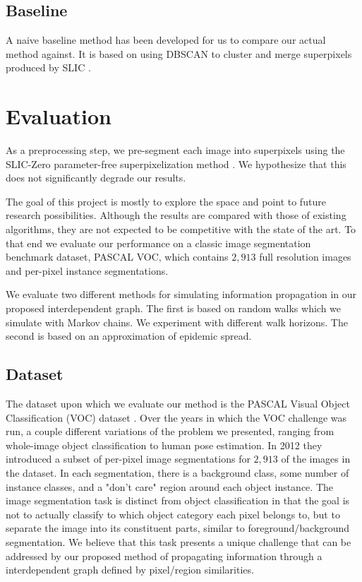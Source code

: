 \documentclass[twocolumn]{article}
\newcommand{\todo}[1]{}
\newcommand{\seclab}[1]{\label{sec:#1}}
\begin{document}
\subsection{Baseline}

A naive baseline method has been developed for us to compare our actual method
against. It is based on using DBSCAN \cite{ester1996density} to cluster and
merge superpixels produced by SLIC \cite{achanta2010slic}.

\section{Evaluation}\seclab{eval}


As a preprocessing step, we pre-segment each image into superpixels using the
SLIC-Zero parameter-free superpixelization method \cite{achanta2010slic}. We
hypothesize that this does not significantly degrade our results. 

The goal of this project is mostly to explore the space and point to future
research possibilities. Although the results are compared with those of
existing algorithms, they are not expected to be competitive with the state of
the art. To that end we evaluate our performance on a classic image segmentation
benchmark dataset, PASCAL VOC, which contains $2,913$ full resolution images and
per-pixel instance segmentations.

We evaluate two different methods for simulating information propagation in our
proposed interdependent graph. The first is based on random walks which we
simulate with Markov chains. We experiment with different walk horizons. The
second is based on an approximation of epidemic spread. \todo{Emory, please
explain this in detail here.}

\subsection{Dataset}\seclab{data}

The dataset upon which we evaluate our method is the PASCAL Visual Object
Classification (VOC) dataset \cite{Everingham10}. Over the years in which the
VOC challenge was run, a couple different variations of the problem we
presented, ranging from whole-image object classification to human pose
estimation. In 2012 they introduced a subset of per-pixel image segmentations
for $2,913$ of the images in the dataset. In each segmentation, there is a
background class, some number of instance classes, and a "don't care" region
around each object instance. The image segmentation task is distinct from
object classification in that the goal is not to actually classify to which
object category each pixel belongs to, but to separate the image into its
constituent parts, similar to foreground/background segmentation. We believe
that this task presents a unique challenge that can be addressed by our proposed
method of propagating information through a interdependent graph defined by
pixel/region similarities.
\end{document}
